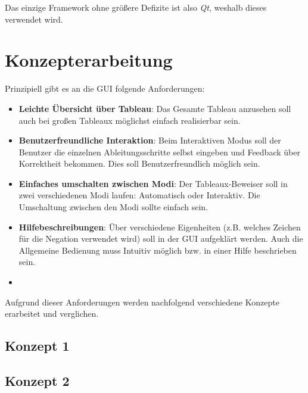 Das einzige Framework ohne größere Defizite ist also \textit{Qt}, weshalb dieses verwendet wird.

\section{Konzepterarbeitung}
Prinzipiell gibt es an die \ac{GUI} folgende Anforderungen:
\begin{itemize}
\item \textbf{Leichte Übersicht über Tableau}: Das Gesamte Tableau anzusehen soll auch bei großen Tableaux möglichst einfach realisierbar sein.

\item \textbf{Benutzerfreundliche Interaktion}: Beim Interaktiven Modus soll der Benutzer die einzelnen Ableitungsschritte selbst eingeben und Feedback über Korrektheit bekommen. Dies soll Benutzerfreundlich möglich sein.

\item \textbf{Einfaches umschalten zwischen Modi}: Der Tableaux-Beweiser soll in zwei verschiedenen Modi laufen: Automatisch oder Interaktiv. Die Umschaltung zwischen den Modi sollte einfach sein.

\item \textbf{Hilfebeschreibungen}: Über verschiedene Eigenheiten (z.B. welches Zeichen für die Negation verwendet wird) soll in der \ac{GUI} aufgeklärt werden. Auch die Allgemeine Bedienung muss Intuitiv möglich bzw. in einer Hilfe beschrieben sein.

\item \textbf{}
\end{itemize}

Aufgrund dieser Anforderungen werden nachfolgend verschiedene Konzepte erarbeitet und verglichen.

\subsection{Konzept 1}
\subsection{Konzept 2}